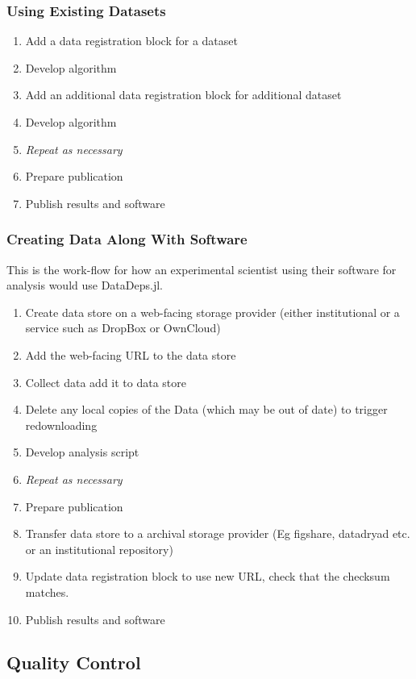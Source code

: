 \documentclass{jors}
\begin{document}
\subsubsection{Using Existing Datasets}
\begin{enumerate}
	\item Add a data registration block for a dataset
	\item Develop algorithm
	\item Add an additional data registration block for additional dataset 
	\item Develop algorithm
	\item \emph{Repeat as necessary}
	\item Prepare publication
	\item Publish results and software
\end{enumerate}

\subsubsection{Creating Data Along With Software}
This is the work-flow for how an experimental scientist using their software for analysis would use DataDeps.jl.
\begin{enumerate}
	\item Create data store on a web-facing storage provider (either institutional or a service such as DropBox or OwnCloud)
	\item Add the web-facing URL to the data store 
	\item Collect data add it to data store
	\item Delete any local copies of the Data (which may be out of date) to trigger redownloading
	\item Develop analysis script
	\item \emph{Repeat as necessary}
	\item Prepare publication
	\item Transfer data store to a archival storage provider (Eg figshare, datadryad etc. or an institutional repository)
	\item Update data registration block to use new URL, check that the checksum matches.
	\item Publish results and software
\end{enumerate}



\subsection{Quality Control}
\end{document}
